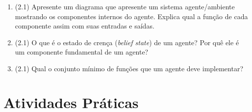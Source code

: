 \documentclass{article}
\begin{document}
\begin{enumerate}
\item (2.1) Apresente um diagrama que apresente um sistema agente/ambiente mostrando os componentes internos do agente. Explica qual a função de cada componente assim com suas entradas e saídas.

\item (2.1) O que é o estado de crença (\textit{belief state}) de um agente? Por quê ele é um componente fundamental de um agente?

\item (2.1) Qual o conjunto mínimo de funções que um agente deve implementar?


\end{enumerate}


\section{Atividades Práticas}
\end{document}

